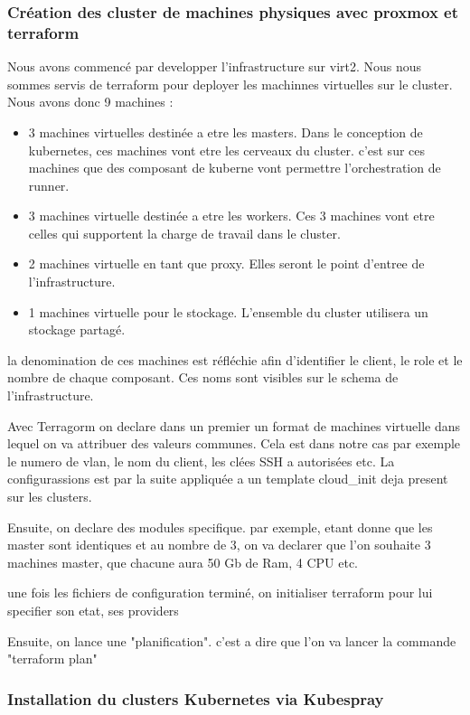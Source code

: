 \documentclass[12pt]{article}
\begin{document}
\subsubsection{Création des cluster de machines physiques avec proxmox et  terraform}
Nous avons commencé par developper l'infrastructure sur virt2. Nous nous sommes servis de terraform pour deployer les machinnes virtuelles sur le cluster. 
Nous avons donc 9 machines :

\begin{itemize}
    \item 3 machines virtuelles destinée a etre les masters. 
    Dans le conception de kubernetes, ces machines vont etre les cerveaux du cluster.
     c'est sur ces machines que des composant de kuberne vont permettre l'orchestration de runner.
    \item 3 machines virtuelle destinée a etre les workers. 
    Ces 3 machines vont etre celles qui supportent la charge de travail dans le cluster.
    \item 2 machines virtuelle en tant que proxy. 
    Elles seront le point d'entree de l'infrastructure. 
    \item 1 machines virtuelle pour le stockage. 
    L'ensemble du cluster utilisera un stockage partagé.
\end{itemize}

la denomination de ces machines est réfléchie afin d'identifier le client, le role et le nombre de chaque composant. 
Ces noms sont visibles sur le schema de l'infrastructure.

Avec Terragorm on declare dans un premier un format de machines virtuelle dans lequel on va attribuer des valeurs communes. 
Cela est dans notre cas par exemple le numero de vlan, le nom du client, les clées SSH a autorisées etc. 
La configurassions est par la suite appliquée a un template cloud\_init deja present sur les clusters.

Ensuite, on declare des modules specifique. par exemple, etant donne que les master sont identiques et au nombre de 3, on va declarer que l'on souhaite 3 machines master, que chacune aura 50 Gb de Ram, 4 CPU etc. 

une fois les fichiers de configuration terminé, on initialiser terraform pour lui specifier son etat, ses providers 

Ensuite, on lance une "planification". c'est a dire que l'on va lancer la commande "terraform plan"

\subsubsection{Installation du clusters Kubernetes via Kubespray}
\end{document}
